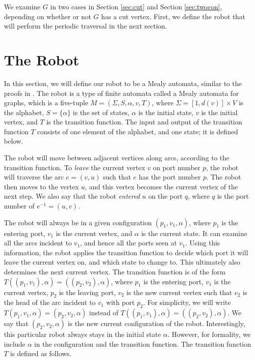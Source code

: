 \documentclass[12pt,letterpaper,oneside]{book}
\begin{document}
We examine $G$ in two cases in Section \ref{sec:cut} and Section \ref{sec:twocon}, depending on whether or not $G$ has a cut vertex.  
First, we define the robot that will perform the periodic traversal in the next section.  


\newpage
\section{The Robot}
\label{sec:robot}


In this section, %
we will define our robot to be a Mealy automata, similar to the proofs in \cite{GKMNZ}.  
The robot is a type of finite automata called a Mealy automata for graphs, which is a five-tuple $M=(\Sigma,S,\alpha,v,T)$, 
where $\Sigma=[1,d(v)] \times V$ is the 
alphabet, $S = \{\alpha \}$ is the set of states, $\alpha$ is the initial state, $v$ is the initial vertex, 
and $T$ is the transition function.  The input and output of the transition function $T$ consists of one 
element of the alphabet, and one state; it is defined below. 


The robot will move between adjacent vertices along arcs, according to the 
transition function.  To \emph{leave} the current vertex $v$ on port number $p$, the robot will traverse the arc $e=(v,u)$ such that $e$ has the  
port number $p$.   
The robot then moves to the vertex $u$, and this vertex becomes the current vertex of the next step.  We also say that the robot \emph{entered}  
$u$ on the port $q$, where $q$ is the port number of $e^{-1}=(u,v)$.  


The robot will always be in a given configuration $(p_1,v_1,\alpha)$, where $p_1$ is the entering port, $v_1$ is the current 
vertex, and $\alpha$ is the current state.  
It can examine all the arcs incident to $v_1$, and hence all the ports 
seen at $v_1$.  Using this information, the robot applies the transition function to decide which port it 
will leave the current vertex on, and which 
state to change to.  This ultimately also determines the next current vertex.  
The transition function is of the form $T((p_1,v_1),\alpha)=((p_2,v_2),\alpha)$, where 
$p_1$ is the entering port, $v_1$ is the current vertex, $p_2$ is the leaving port, 
$v_2$ is the new current vertex such that $v_2$ is the head of the arc incident to $v_1$ with port $p_2$.  For 
simplicity, we will write $T(p_1,v_1,\alpha)=(p_2,v_2,\alpha)$ instead of $T((p_1,v_1),\alpha)=((p_2,v_2),\alpha)$.  
We say that $(p_2,v_2,\alpha)$ is the new current configuration of the robot.  
Interestingly, this 
particular robot always stays in the initial state $\alpha$.  However, for formality, we include $\alpha$ 
in the configuration and the transition function.  
The transition function $T$ is defined as follows.  
\end{document}
